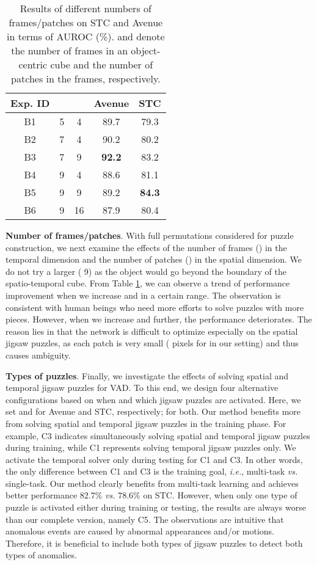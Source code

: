 \documentclass[runningheads]{llncs}
\begin{document}
\begin{table}
    \centering
    \caption{Results of different numbers of frames/patches on STC and Avenue in terms of AUROC (\%).  and  denote the number of frames in an object-centric cube and the number of patches in the frames, respectively.}
    \begin{tabular}{c|c|c|cc}
    \hline
    \textbf{Exp. ID} & \bm{} & \bm{} & \textbf{Avenue}  & \textbf{STC}  \\
    \hline\hline
    B1 & 5 & 4 & 89.7 &  79.3 \\
    B2 & 7 & 4 & 90.2 &  80.2 \\
    B3 & 7 & 9 & \textbf{92.2} &  83.2 \\
    B4 & 9 & 4 & 88.6 &  81.1 \\
    B5 & 9 & 9 & 89.2 & \textbf{84.3} \\
    B6 & 9 & 16 & 87.9 &  80.4 \\
    \hline
    \end{tabular}
    \label{tab:numer_of_frames}
\end{table}


\textbf{Number of frames/patches}. With full permutations considered for puzzle construction, we next examine the effects of the number of frames () in the temporal dimension and the number of patches () in the spatial dimension. We do not try a larger  (  9) as the object would go beyond the boundary of the spatio-temporal cube. From Table \ref{tab:numer_of_frames}, we can observe a trend of performance improvement when we increase  and  in a certain range. The observation is consistent with human beings who need more efforts to solve puzzles with more pieces. However, when we increase  and  further, the performance deteriorates. The reason lies in that the network is difficult to optimize especially on the spatial jigsaw puzzles, as each patch is very small ( pixels for  in our setting) and thus causes ambiguity. 

\textbf{Types of puzzles}. Finally, we investigate the effects of solving spatial and temporal jigsaw puzzles for VAD. To this end, we design four alternative configurations based on when and which jigsaw puzzles are activated. Here, we set  and  for Avenue and STC, respectively;  for both. Our method benefits more from solving spatial and temporal jigsaw puzzles in the training phase. For example, C3 indicates simultaneously solving spatial and temporal jigsaw puzzles during training, while C1 represents solving temporal jigsaw puzzles only. We activate the temporal solver only during testing for C1 and C3. In other words, the only difference between C1 and C3 is the training goal, \emph{i.e.}, multi-task \emph{vs.} single-task. Our method clearly benefits from multi-task learning and achieves better performance 82.7\% \emph{vs.} 78.6\% on STC. However, when only one type of puzzle is activated either during training or testing, the results are always worse than our complete version, namely C5. The observations are intuitive that anomalous events are caused by abnormal appearances and/or motions. Therefore, it is beneficial to include both types of jigsaw puzzles to detect both types of anomalies.
\end{document}
